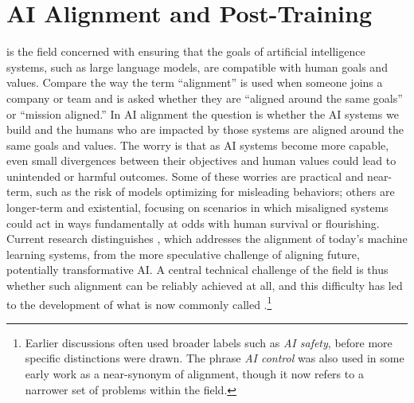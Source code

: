 \chapter{AI Alignment and Post-Training}\label{ch_ai_alignment}


 is the field concerned with ensuring that the goals of artificial intelligence systems, such as large language models, are compatible with human goals and values. Compare the way the term ``alignment''  is used when someone joins a company or team and is asked whether they are ``aligned around the same goals'' or ``mission aligned.''  In AI alignment the question is whether the AI systems we build and the humans who are impacted by those systems are aligned around the same goals and values. The worry is that as AI systems become more capable, even small divergences between their objectives and human values could lead to unintended or harmful outcomes.  Some of these worries are practical and near-term, such as the risk of models optimizing for misleading behaviors; others are longer-term and existential, focusing on scenarios in which misaligned  systems could act in ways fundamentally at odds with human survival or flourishing. Current research distinguishes , which addresses the alignment of today’s machine learning systems, from the more speculative challenge of aligning future, potentially transformative AI. A central technical challenge of the field is thus whether such alignment can be reliably achieved at all, and this difficulty has led to the development of what is now commonly called .\footnote{Earlier discussions often used broader labels such as \emph{AI safety}, before more specific distinctions were drawn.  The phrase \emph{AI control} was also used in some early work as a near-synonym of alignment, though it now refers to a narrower set of problems within the field.}

